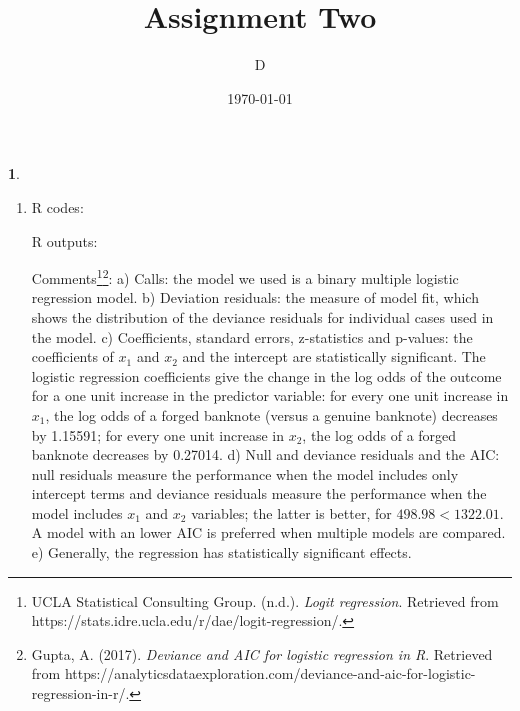 \documentclass[10pt]{article}
\author{D}
\newtheorem{prob}{\bm{$Problem$}}
\begin{document}
\title{Assignment Two}
\date{\today}
\maketitle
\thispagestyle{fancy}
\thispagestyle{fancy}

\begin{prob}
\end{prob}
\begin{enumerate}[1)]
\vspace{3mm}

\item
R codes:

\vspace{3mm}
R outputs:

\vspace{3mm}
Comments\footnote{ UCLA Statistical Consulting Group. (n.d.). \textit{Logit regression}. Retrieved from https://stats.idre.ucla.edu/r/dae/logit-regression/.}\footnote{ Gupta, A. (2017). \textit{Deviance and AIC for logistic regression in R}. Retrieved from https://analyticsdataexploration.com/deviance-and-aic-for-logistic-regression-in-r/.}:
\subitem
a) Calls: the model we used is a binary multiple logistic regression model.
\subitem
b) Deviation residuals: the measure of model fit, which shows the distribution of the deviance residuals for individual cases used in the model.
\subitem
c) Coefficients, standard errors, z-statistics and p-values: the coefficients of $x_1$ and $x_2$ and the intercept are statistically significant. The logistic regression coefficients give the change in the log odds of the outcome for a one unit increase in the predictor variable: for every one unit increase in $x_1$, the log odds of a forged banknote (versus a genuine banknote) decreases by 1.15591; for every one unit increase in $x_2$, the log odds of a forged banknote decreases by 0.27014.
\subitem
d) Null and deviance residuals and the AIC: null residuals measure the performance when the model includes only intercept terms and deviance residuals measure the performance when the model includes $x_1$ and $x_2$ variables; the latter is better, for $498.98<1322.01$. A model with an lower AIC is preferred when multiple models are compared.
\subitem
e) Generally, the regression has statistically significant effects.
\vspace{3mm}


\end{enumerate}
\end{document}
